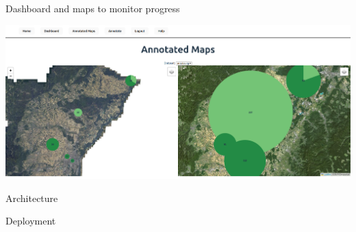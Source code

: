 \documentclass{beamer}
\begin{document}
\begin{frame}{Dashboard and maps to monitor progress}

\begin{center}
	\includegraphics[width=\linewidth]{figures/example_annotatordashboard.png}
\end{center}

\end{frame}



\begin{frame}{Architecture}





\end{frame}



\begin{frame}{Deployment}






\end{frame}
\end{document}

